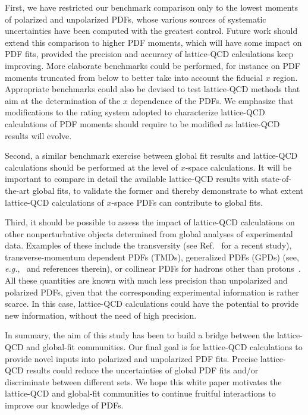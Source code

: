 First, we have restricted our benchmark comparison only to the lowest moments 
of polarized and unpolarized PDFs, whose various sources of systematic 
uncertainties have been computed with the greatest control.
%
Future work should extend this comparison to higher PDF moments,
which will have some impact on PDF fits, provided the precision and accuracy
of lattice-QCD calculations keep improving.
%
More elaborate benchmarks could be performed, for instance on PDF moments
truncated from below to better take into account the fiducial $x$ region.
%
Appropriate benchmarks could also be devised to test lattice-QCD methods
that aim at the determination of the $x$ dependence of the PDFs.
%
We emphasize that modifications to the rating system adopted to
characterize  lattice-QCD calculations of PDF moments should require to 
be modified as lattice-QCD results will evolve.

Second, a similar benchmark exercise between global fit results and 
lattice-QCD calculations should be performed at the level of
$x$-space calculations.
%
It will be important to compare in detail the available lattice-QCD results 
with state-of-the-art global fits, to validate the former and
thereby demonstrate to what extent lattice-QCD calculations of $x$-space PDFs 
can contribute to global fits.

Third, it should be possible to assess the impact of lattice-QCD 
calculations on other nonperturbative objects
determined from global analyses of experimental data.
%
Examples of these include the transversity (see Ref.~\cite{Lin:2017stx}
for a recent study), transverse-momentum dependent 
PDFs (TMDs), generalized PDFs (GPDs) (see, 
{\it e.g.},~\cite{Angeles-Martinez:2015sea} and references therein), 
or collinear PDFs for hadrons other than 
protons~\cite{Sutton:1991ay,Burkardt:2001jg}.
%
All these quantities are known with much less precision than unpolarized
and polarized PDFs, given that the corresponding experimental information
is rather scarce. 
%
In this case, lattice-QCD calculations could have the potential
to provide new information, without the need of high precision.

In summary, the aim of this study has been to build a bridge between the 
lattice-QCD and global-fit communities.
%
Our final goal is for lattice-QCD calculations to provide novel inputs into 
polarized and unpolarized PDF fits. 
%
Precise lattice-QCD results could reduce the uncertainties of
global PDF fits and/or discriminate between different sets.
%
We hope this white paper motivates the lattice-QCD and global-fit
communities to continue fruitful interactions to improve our knowledge of PDFs.
